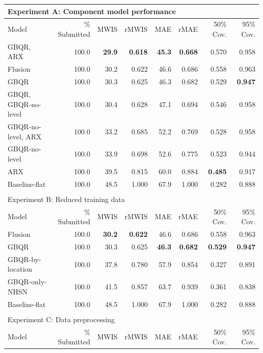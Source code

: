 \documentclass{article}\usepackage[]{graphicx}\usepackage[]{xcolor}
\begin{document}
\begin{table}[htbp]
\centering
\begin{tabular}{lrrrrrrr}
\multicolumn{8}{l}{Experiment A: Component model performance} \\
  \toprule
Model & \% Submitted & MWIS & rMWIS & MAE & rMAE & 50\% Cov. & 95\% Cov. \\ 
  \midrule
GBQR, ARX & 100.0 & \textbf{29.9} & \textbf{0.618} & \textbf{45.3} & \textbf{0.668} & 0.570 & 0.958 \\ 
  Flusion & 100.0 & 30.2 & 0.622 & 46.6 & 0.686 & 0.558 & 0.963 \\ 
  GBQR & 100.0 & 30.3 & 0.625 & 46.3 & 0.682 & 0.529 & \textbf{0.947} \\ 
  GBQR, GBQR-no-level & 100.0 & 30.4 & 0.628 & 47.1 & 0.694 & 0.546 & 0.958 \\ 
  GBQR-no-level, ARX & 100.0 & 33.2 & 0.685 & 52.2 & 0.769 & 0.528 & 0.958 \\ 
  GBQR-no-level & 100.0 & 33.9 & 0.698 & 52.6 & 0.775 & 0.523 & 0.944 \\ 
  ARX & 100.0 & 39.5 & 0.815 & 60.0 & 0.884 & \textbf{0.485} & 0.917 \\ 
  Baseline-flat & 100.0 & 48.5 & 1.000 & 67.9 & 1.000 & 0.282 & 0.888 \\ 
   \bottomrule
\\
\multicolumn{8}{l}{Experiment B: Reduced training data} \\
  \toprule
Model & \% Submitted & MWIS & rMWIS & MAE & rMAE & 50\% Cov. & 95\% Cov. \\ 
  \midrule
Flusion & 100.0 & \textbf{30.2} & \textbf{0.622} & 46.6 & 0.686 & 0.558 & 0.963 \\ 
  GBQR & 100.0 & 30.3 & 0.625 & \textbf{46.3} & \textbf{0.682} & \textbf{0.529} & \textbf{0.947} \\ 
  GBQR-by-location & 100.0 & 37.8 & 0.780 & 57.9 & 0.854 & 0.327 & 0.891 \\ 
  GBQR-only-NHSN & 100.0 & 41.5 & 0.857 & 63.7 & 0.939 & 0.361 & 0.838 \\ 
  Baseline-flat & 100.0 & 48.5 & 1.000 & 67.9 & 1.000 & 0.282 & 0.888 \\ 
   \bottomrule
\\
\multicolumn{8}{l}{Experiment C: Data preprocessing} \\
  \toprule
Model & \% Submitted & MWIS & rMWIS & MAE & rMAE & 50\% Cov. & 95\% Cov. \\ 

\end{tabular}
\end{table}
\end{document}

